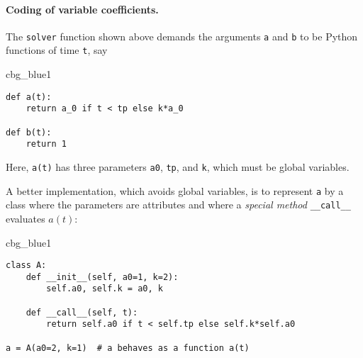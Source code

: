 \documentclass[graybox,sectrefs,envcountresetchap,open=right,final]{svmonodo}
\newenvironment{_cod_tight}[1]{
   \def\FrameCommand{\colorbox{#1}}
   \FrameRule0.6pt\MakeFramed {\FrameRestore}\vskip3mm}
   {\vskip0mm\endMakeFramed}
\newenvironment{cod}[1]{
\bgroup\rmfamily
\fboxsep=0mm\relax
\begin{_cod_tight}{#1}
\list{}{\parsep=-2mm\parskip=0mm\topsep=0pt\leftmargin=2mm
\rightmargin=2\leftmargin\leftmargin=4pt\relax}
\item\relax}
{\endlist\end{_cod_tight}\egroup}
\begin{document}
\paragraph{Coding of variable coefficients.}
The \texttt{solver} function shown above demands the arguments \texttt{a} and \texttt{b} to
be Python functions of time \texttt{t}, say

\begin{cod}{cbg_blue1}\begin{Verbatim}[numbers=none,fontsize=\fontsize{9pt}{9pt},baselinestretch=0.95,xleftmargin=2mm]
def a(t):
    return a_0 if t < tp else k*a_0

def b(t):
    return 1
\end{Verbatim}
\end{cod}
\noindent
Here, \texttt{a(t)} has three parameters \texttt{a0}, \texttt{tp}, and \texttt{k},
which must be global variables.

A better implementation, which avoids global variables,
is to represent \texttt{a} by a class where the
parameters are attributes and where a \emph{special method} \Verb!__call__!
evaluates $a(t)$:

\begin{cod}{cbg_blue1}\begin{Verbatim}[numbers=none,fontsize=\fontsize{9pt}{9pt},baselinestretch=0.95,xleftmargin=2mm]
class A:
    def __init__(self, a0=1, k=2):
        self.a0, self.k = a0, k

    def __call__(self, t):
        return self.a0 if t < self.tp else self.k*self.a0

a = A(a0=2, k=1)  # a behaves as a function a(t)
\end{Verbatim}
\end{cod}
\noindent

\end{document}
